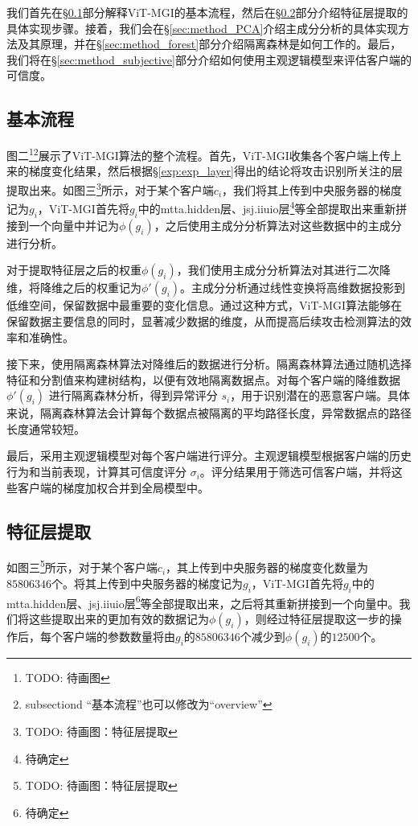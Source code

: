 \documentclass[conference]{IEEEtran}
\begin{document}
我们首先在\hyperref[sec:method_basic]{§\ref{sec:method_basic}}部分解释ViT-MGI的基本流程，然后在\hyperref[sec:method_layer]{§\ref{sec:method_layer}}部分介绍特征层提取的具体实现步骤。接着，我们会在\hyperref[sec:method_PCA]{§\ref{sec:method_PCA}}介绍主成分分析的具体实现方法及其原理，并在\hyperref[sec:method_forest]{§\ref{sec:method_forest}}部分介绍隔离森林是如何工作的。最后，我们将在\hyperref[sec:method_subjective]{§\ref{sec:method_subjective}}部分介绍如何使用主观逻辑模型来评估客户端的可信度。

\subsection{基本流程}
\label{sec:method_basic}

图二\footnote{TODO: 待画图}\footnote{subsectiond “基本流程”也可以修改为“overview”}展示了ViT-MGI算法的整个流程。首先，ViT-MGI收集各个客户端上传上来的梯度变化结果，然后根据\hyperref[exp:exp_layer]{§\ref{exp:exp_layer}}得出的结论将攻击识别所关注的层提取出来。如图三\footnote{TODO: 待画图：特征层提取}所示，对于某个客户端$c_i$，我们将其上传到中央服务器的梯度记为$g_i$，ViT-MGI首先将$g_i$中的mtta.hidden层、jsj.iiuio层\footnote{待确定}等全部提取出来重新拼接到一个向量中并记为$\phi(g_i)$，之后使用主成分分析算法对这些数据中的主成分进行分析。

对于提取特征层之后的权重$\phi(g_i)$，我们使用主成分分析算法对其进行二次降维，将降维之后的权重记为$\phi'(g_i)$。主成分分析通过线性变换将高维数据投影到低维空间，保留数据中最重要的变化信息。通过这种方式，ViT-MGI算法能够在保留数据主要信息的同时，显著减少数据的维度，从而提高后续攻击检测算法的效率和准确性。

接下来，使用隔离森林算法对降维后的数据进行分析。隔离森林算法通过随机选择特征和分割值来构建树结构，以便有效地隔离数据点。对每个客户端的降维数据 $\phi'(g_i)$ 进行隔离森林分析，得到异常评分 $s_i$，用于识别潜在的恶意客户端。具体来说，隔离森林算法会计算每个数据点被隔离的平均路径长度，异常数据点的路径长度通常较短。

最后，采用主观逻辑模型对每个客户端进行评分。主观逻辑模型根据客户端的历史行为和当前表现，计算其可信度评分 $\sigma_i$。评分结果用于筛选可信客户端，并将这些客户端的梯度加权合并到全局模型中。

\subsection{特征层提取}
\label{sec:method_layer}

如图三\footnote{TODO: 待画图：特征层提取}所示，对于某个客户端$c_i$，其上传到中央服务器的梯度变化数量为$85806346$个。将其上传到中央服务器的梯度记为$g_i$，ViT-MGI首先将$g_i$中的mtta.hidden层、jsj.iiuio层\footnote{待确定}等全部提取出来，之后将其重新拼接到一个向量中。我们将这些提取出来的更加有效的数据记为$\phi(g_i)$，则经过特征层提取这一步的操作后，每个客户端的参数数量将由$g_i$的$85806346$个减少到$\phi(g_i)$的$12500$个。
\end{document}
